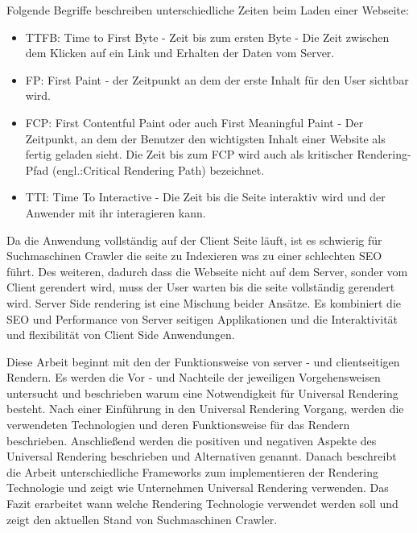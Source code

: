 \documentclass[runningheads]{llncs}
\begin{document}
Folgende Begriffe beschreiben unterschiedliche Zeiten beim Laden einer Webseite:
\begin{itemize}
  \item TTFB: Time to First Byte - Zeit bis zum ersten Byte -  Die Zeit zwischen dem Klicken auf ein Link und Erhalten der Daten vom Server.
  \item FP: First Paint - der Zeitpunkt an dem der erste Inhalt für den User sichtbar wird.
  \item FCP: First Contentful Paint oder auch First Meaningful Paint - Der Zeitpunkt, an dem der Benutzer den wichtigsten Inhalt einer Website als fertig geladen sieht. Die Zeit bis zum FCP wird auch als kritischer Rendering-Pfad (engl.:Critical Rendering Path) bezeichnet.
  \item TTI: Time To Interactive - Die Zeit bis die Seite interaktiv wird und der Anwender mit ihr interagieren kann.
\end{itemize}
Da die Anwendung vollständig auf der Client Seite läuft, ist es schwierig für Suchmaschinen Crawler die seite zu Indexieren was zu einer schlechten SEO führt.
Des weiteren, dadurch dass die Webseite nicht auf dem Server, sonder vom Client gerendert wird, muss der User warten bis die seite vollständig gerendert wird.
Server Side rendering ist eine Mischung beider Ansätze. Es kombiniert die SEO und Performance von Server seitigen Applikationen und die Interaktivität und flexibilität von Client Side Anwendungen.

Diese Arbeit beginnt mit den der Funktionsweise von server - und clientseitigen Rendern. 
Es werden die Vor - und Nachteile der jeweiligen Vorgehensweisen untersucht 
und beschrieben warum eine Notwendigkeit für Universal Rendering besteht. Nach einer Einführung in den Universal Rendering Vorgang, werden die verwendeten Technologien und deren Funktionsweise für das Rendern beschrieben. Anschließend werden die positiven und negativen Aspekte des Universal Rendering beschrieben und Alternativen genannt. Danach beschreibt die Arbeit unterschiedliche Frameworks zum implementieren der Rendering Technologie und zeigt wie Unternehmen Universal Rendering verwenden. Das Fazit erarbeitet wann welche Rendering Technologie verwendet werden soll und zeigt den aktuellen Stand von Suchmaschinen Crawler.
\newpage
\end{document}
